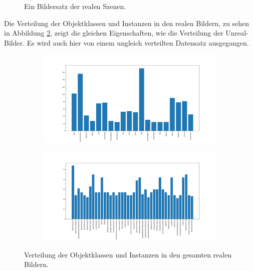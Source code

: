\begin{figure}
\begin{subfigure}[b]{0.3\textwidth}
	\end{subfigure}
\caption[Reale Bilder einer Szene]{Ein Bildersatz der realen Szenen.}
\label{fig:exampleSceneReal}
\end{figure}

Die Verteilung der Objektklassen und Instanzen in den realen Bildern, zu sehen in Abbildung \ref{fig:Real-Images_analysis}, zeigt die gleichen Eigenschaften, wie die Verteilung der Unreal-Bilder. Es wird auch hier von einem ungleich verteilten Datensatz ausgegangen. 

\begin{figure}
\centering
	\begin{subfigure}[b]{\textwidth}
		\includegraphics[width=\textwidth]{img/chapter6/RealGTClass_analysis.png}
	\end{subfigure}
	\begin{subfigure}[b]{\textwidth}
		\includegraphics[width=\textwidth]{img/chapter6/RealGTInstance_analysis.png}	
	\end{subfigure}
\caption[Verteilung der Objekte in den realen Bildern]{Verteilung der Objektklassen und Instanzen in den gesamten realen Bildern.}
\label{fig:Real-Images_analysis}
\end{figure}

